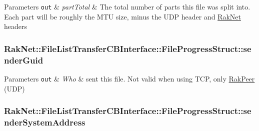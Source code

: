 \begin{DoxyParams}[1]{Parameters}
\mbox{\tt out}  & {\em part\-Total} & The total number of parts this file was split into. Each part will be roughly the M\-T\-U size, minus the U\-D\-P header and \hyperlink{namespace_rak_net}{Rak\-Net} headers \\
\hline
\end{DoxyParams}
\hypertarget{struct_rak_net_1_1_file_list_transfer_c_b_interface_1_1_file_progress_struct_a4002294a3a3e615542976f8fece02a89}{
\subsubsection[{sender\-Guid}]{ Rak\-Net\-::\-File\-List\-Transfer\-C\-B\-Interface\-::\-File\-Progress\-Struct\-::sender\-Guid}}\label{struct_rak_net_1_1_file_list_transfer_c_b_interface_1_1_file_progress_struct_a4002294a3a3e615542976f8fece02a89}

\begin{DoxyParams}[1]{Parameters}
\mbox{\tt out}  & {\em Who} & sent this file. Not valid when using T\-C\-P, only \hyperlink{class_rak_net_1_1_rak_peer}{Rak\-Peer} (U\-D\-P) \\
\hline
\end{DoxyParams}
\hypertarget{struct_rak_net_1_1_file_list_transfer_c_b_interface_1_1_file_progress_struct_a73043610499f536dc992e27b8de69908}{
\subsubsection[{sender\-System\-Address}]{ Rak\-Net\-::\-File\-List\-Transfer\-C\-B\-Interface\-::\-File\-Progress\-Struct\-::sender\-System\-Address}}\label{struct_rak_net_1_1_file_list_transfer_c_b_interface_1_1_file_progress_struct_a73043610499f536dc992e27b8de69908}


